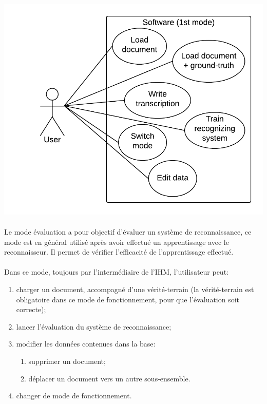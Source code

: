 \paragraph{}

\begin{mdframed}[frametitle={Figure 2 : Diagramme de cas d'utilisation (mode apprentissage)}, innerbottommargin=10]
\begin{center}
\includegraphics[scale=0.6]{Usecase_1.png}
\end{center}
\end{mdframed}

\paragraph{}

Le mode évaluation a pour objectif d’évaluer un système de reconnaissance, ce mode est en général utilisé après avoir effectué un apprentissage avec le reconnaisseur. Il permet de vérifier l’efficacité de l’apprentissage effectué.

\paragraph{}

Dans ce mode, toujours par l’intermédiaire de l’IHM, l’utilisateur peut:

\begin{enumerate}
	\item charger un document, accompagné d’une vérité-terrain (la vérité-terrain est obligatoire dans ce mode de fonctionnement, pour que l’évaluation soit correcte);
	\item lancer l’évaluation du système de reconnaissance;
	\item modifier les données contenues dans la base:
		\begin{enumerate}
			\item supprimer un document;
			\item déplacer un document vers un autre sous-ensemble.
		\end{enumerate}
	\item changer de mode de fonctionnement.
\end{enumerate}


